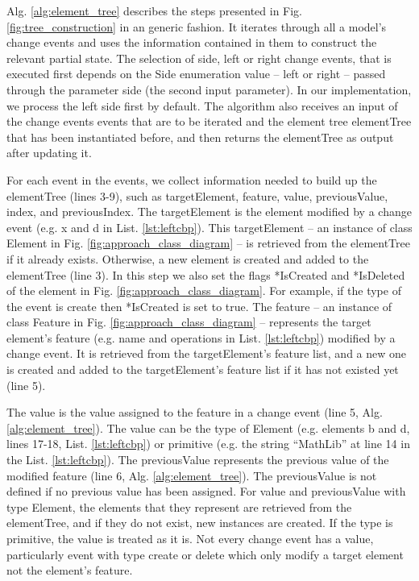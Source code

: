 Alg. \ref{alg:element_tree} describes the steps presented in Fig. \ref{fig:tree_construction} in an generic fashion. It iterates through all a model's change events and uses the information contained in them to construct the relevant partial state. The selection of side, left or right change events, that is executed first depends on the \textsf{Side} enumeration value -- \textsf{left} or \textsf{right} -- passed through the parameter \textsf{side} (the second input parameter). In our implementation, we process the left side first by default. The algorithm also receives an input of the change events \textsf{events} that are to be iterated and the element tree \textsf{elementTree} that has been instantiated before, and then returns the \textsf{elementTree} as output after updating it.

For each \textsf{event} in the \textsf{events}, we collect information needed to build up the \textsf{elementTree}  (lines 3-9), such as \textsf{targetElement}, \textsf{feature}, \textsf{value}, \textsf{previousValue}, \textsf{index}, and \textsf{previousIndex}. The \textsf{targetElement} is the element modified by a change event (e.g. \textsf{x} and \textsf{d} in List. \ref{lst:leftcbp}). This \textsf{targetElement} -- an instance of class Element in Fig. \ref{fig:approach_class_diagram} -- is retrieved from the \textsf{elementTree} if it already exists. Otherwise, a new element is created and added to the \textsf{elementTree} (line 3). In this step we also set the flags \textsf{*IsCreated} and \textsf{*IsDeleted} of the element in Fig. \ref{fig:approach_class_diagram}. For example, if the type of the event is \textsf{create} then \textsf{*IsCreated} is set to \textsf{true}. The \textsf{feature} -- an instance of class Feature in Fig. \ref{fig:approach_class_diagram} -- represents the target element's feature (e.g. \textsf{name} and \textsf{operations} in List. \ref{lst:leftcbp}) modified by a change event. It is  retrieved from the \textsf{targetElement}'s feature list, and a new one is created and added to the \textsf{targetElement}'s feature list if it has not existed yet (line 5). 

The \textsf{value} is the value assigned to the feature in a change event (line 5, Alg. \ref{alg:element_tree}). The \textsf{value} can be the type of \textsf{Element} (e.g. elements \textsf{b} and  \textsf{d}, lines 17-18, List. \ref{lst:leftcbp}) or primitive (e.g. the string ``MathLib'' at line 14 in the List. \ref{lst:leftcbp}). The \textsf{previousValue} represents the previous value of the modified feature (line 6, Alg. \ref{alg:element_tree}). The \textsf{previousValue} is not defined if no previous value has been assigned. For \textsf{value} and \textsf{previousValue} with type \textsf{Element}, the elements that they represent are retrieved from the \textsf{elementTree}, and if they do not exist, new instances are created. If the type is primitive, the value is treated as it is. Not every change event has a \textsf{value}, particularly event with type \textsf{create} 
or \textsf{delete} which only modify a target element not the element's feature.

